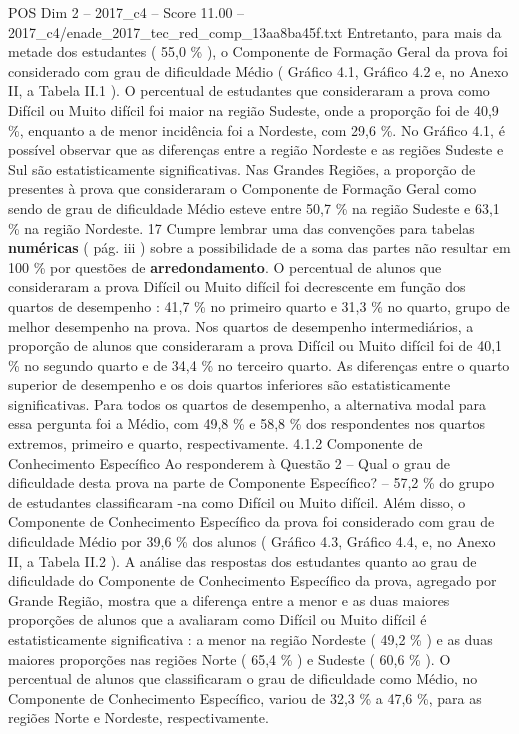\begin{textsample}{POS Dim 2 – 2017\_c4 – Score 11.00 – 2017\_c4/enade\_2017\_tec\_red\_comp\_13aa8ba45f.txt}
Entretanto, para mais da metade dos estudantes ( 55,0 \% ), o Componente de Formação Geral da prova foi considerado com grau de dificuldade Médio ( Gráfico 4.1, Gráfico 4.2 e, no Anexo II, a Tabela II.1 ).
O percentual de estudantes que consideraram a prova como Difícil ou Muito difícil foi maior na região Sudeste, onde a proporção foi de 40,9 \%, enquanto a de menor incidência foi a Nordeste, com 29,6 \%.
No Gráfico 4.1, é possível observar que as diferenças entre a região Nordeste e as regiões Sudeste e Sul são estatisticamente significativas.
Nas Grandes Regiões, a proporção de presentes à prova que consideraram o Componente de Formação Geral como sendo de grau de dificuldade Médio esteve entre 50,7 \% na região Sudeste e 63,1 \% na região Nordeste. 17 Cumpre lembrar uma das convenções para tabelas \textbf{numéricas} ( pág. iii ) sobre a possibilidade de a soma das partes não resultar em 100 \% por questões de \textbf{arredondamento}.
O percentual de alunos que consideraram a prova Difícil ou Muito difícil foi decrescente em função dos quartos de desempenho : 41,7 \% no primeiro quarto e 31,3 \% no quarto, grupo de melhor desempenho na prova.
Nos quartos de desempenho intermediários, a proporção de alunos que consideraram a prova Difícil ou Muito difícil foi de 40,1 \% no segundo quarto e de 34,4 \% no terceiro quarto.
As diferenças entre o quarto superior de desempenho e os dois quartos inferiores são estatisticamente significativas.
Para todos os quartos de desempenho, a alternativa modal para essa pergunta foi a Médio, com 49,8 \% e 58,8 \% dos respondentes nos quartos extremos, primeiro e quarto, respectivamente. 4.1.2 Componente de Conhecimento Específico Ao responderem à Questão 2 – Qual o grau de dificuldade desta prova na parte de Componente Específico? – 57,2 \% do grupo de estudantes classificaram -na como Difícil ou Muito difícil.
Além disso, o Componente de Conhecimento Específico da prova foi considerado com grau de dificuldade Médio por 39,6 \% dos alunos ( Gráfico 4.3, Gráfico 4.4, e, no Anexo II, a Tabela II.2 ).
A análise das respostas dos estudantes quanto ao grau de dificuldade do Componente de Conhecimento Específico da prova, agregado por Grande Região, mostra que a diferença entre a menor e as duas maiores proporções de alunos que a avaliaram como Difícil ou Muito difícil é estatisticamente significativa : a menor na região Nordeste ( 49,2 \% ) e as duas maiores proporções nas regiões Norte ( 65,4 \% ) e Sudeste ( 60,6 \% ).
O percentual de alunos que classificaram o grau de dificuldade como Médio, no Componente de Conhecimento Específico, variou de 32,3 \% a 47,6 \%, para as regiões Norte e Nordeste, respectivamente.

\end{textsample}
